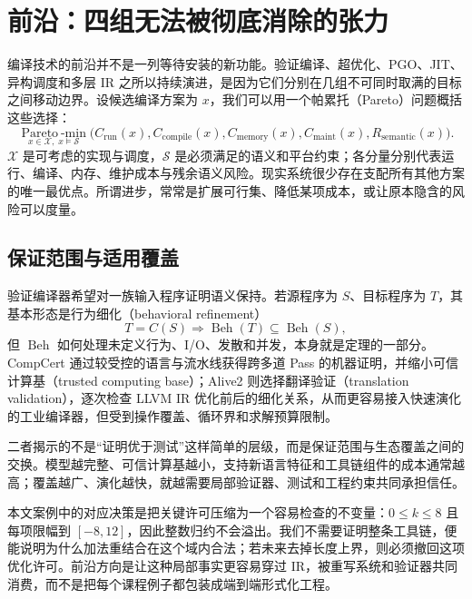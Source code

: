 \section{前沿：四组无法被彻底消除的张力}
\label{sec:frontiers}

编译技术的前沿并不是一列等待安装的新功能。验证编译、超优化、PGO、JIT、异构调度和多层 IR 之所以持续演进，是因为它们分别在几组不可同时取满的目标之间移动边界。设候选编译方案为 $x$，我们可以用一个帕累托（Pareto）问题概括这些选择：
\begin{equation}
  \underset{x\in\mathcal{X},\;x\models\mathcal{S}}{\operatorname{Pareto\!\!-min}}
  \bigl(
    C_{\mathrm{run}}(x),
    C_{\mathrm{compile}}(x),
    C_{\mathrm{memory}}(x),
    C_{\mathrm{maint}}(x),
    R_{\mathrm{semantic}}(x)
  \bigr).
  \label{eq:frontier-pareto}
\end{equation}
$\mathcal{X}$ 是可考虑的实现与调度，$\mathcal{S}$ 是必须满足的语义和平台约束；各分量分别代表运行、编译、内存、维护成本与残余语义风险。现实系统很少存在支配所有其他方案的唯一最优点。所谓进步，常常是扩展可行集、降低某项成本，或让原本隐含的风险可以度量。

\subsection{保证范围与适用覆盖}

验证编译器希望对一族输入程序证明语义保持。若源程序为 $S$、目标程序为 $T$，其基本形态是行为细化（behavioral refinement）
\begin{equation}
  T=C(S)\Longrightarrow \operatorname{Beh}(T)\subseteq\operatorname{Beh}(S),
  \label{eq:frontier-refinement}
\end{equation}
但 $\operatorname{Beh}$ 如何处理未定义行为、I/O、发散和并发，本身就是定理的一部分。CompCert 通过较受控的语言与流水线获得跨多道 Pass 的机器证明，并缩小可信计算基（trusted computing base）\cite{adv-compcert-cacm,adv-compcert-site,adv-compcert-tcb}；Alive2 则选择翻译验证（translation validation），逐次检查 LLVM IR 优化前后的细化关系，从而更容易接入快速演化的工业编译器，但受到操作覆盖、循环界和求解预算限制\cite{adv-alive2}。

二者揭示的不是“证明优于测试”这样简单的层级，而是保证范围与生态覆盖之间的交换。模型越完整、可信计算基越小，支持新语言特征和工具链组件的成本通常越高；覆盖越广、演化越快，就越需要局部验证器、测试和工程约束共同承担信任。

本文案例中的对应决策是把关键许可压缩为一个容易检查的不变量：$0\le k\le8$ 且每项限幅到 $[-8,12]$，因此整数归约不会溢出。我们不需要证明整条工具链，便能说明为什么加法重结合在这个域内合法；若未来去掉长度上界，则必须撤回这项优化许可。前沿方向是让这种局部事实更容易穿过 IR，被重写系统和验证器共同消费，而不是把每个课程例子都包装成端到端形式化工程。

